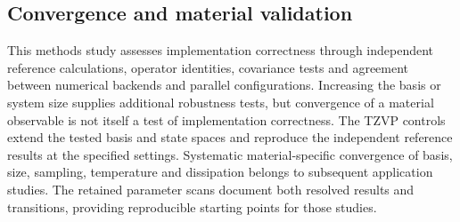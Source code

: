 \subsection{Convergence and material validation}
This methods study assesses implementation correctness through independent
reference calculations, operator identities, covariance tests and agreement
between numerical backends and parallel configurations. Increasing the
basis or system size supplies additional robustness tests, but convergence
of a material observable is not itself a test of implementation correctness.
The TZVP controls extend the tested basis and state spaces and reproduce
the independent reference results at the specified settings.
Systematic material-specific convergence of basis, size, sampling,
temperature and dissipation belongs to subsequent application studies.
The retained parameter scans document both resolved results and transitions,
providing reproducible starting points for those studies.
